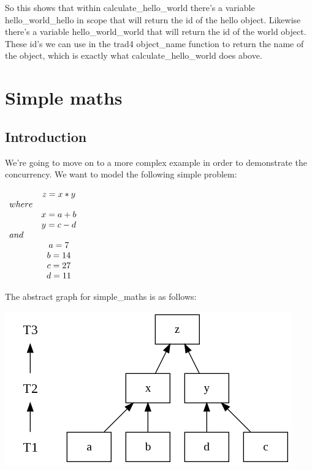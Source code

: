 \documentclass{report}
\begin{document}
So this shows that within calculate_hello_world there's a variable hello_world_hello in scope that will return the id of the hello object. Likewise there's a variable hello_world_world that will return the id of the world object. These id's we can use in the trad4 object_name function to return the name of the object, which is exactly what calculate_hello_world does above.

\chapter{Simple maths}

\section{Introduction}

We're going to move on to a more complex example in order to demonstrate the concurrency. We want to model the following simple problem:

\begin{math}
  \begin{array}{ l c }
        & z = x * y   \\
        where         \\
        & x = a + b   \\
        & y = c - d   \\
        and           \\
        & a = 7       \\
        & b = 14      \\
        & c = 27      \\
        & d = 11      \\
  \end{array} 
\end{math}

The abstract graph for simple_maths is as follows:

\includegraphics[scale=0.5]{simplemathsabstract.png}
\end{document}
